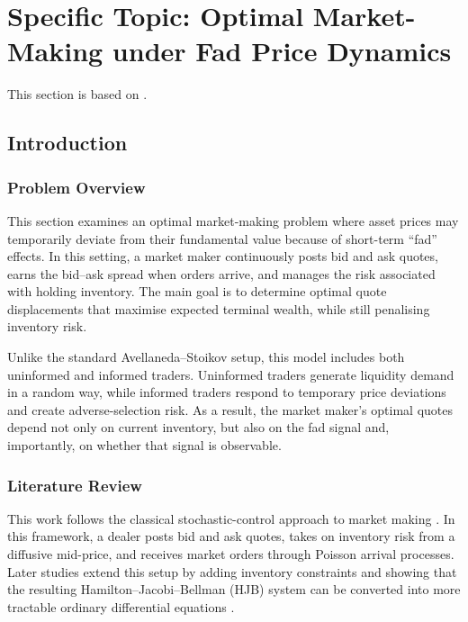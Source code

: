 \documentclass[11pt,a4paper]{article}
\theoremstyle{plain}
\theoremstyle{definition}
\begin{document}
\section{Specific Topic: Optimal Market-Making under Fad Price Dynamics}
\label{sec:specific}

This section is based on \cite{barucci2025market}.

\subsection{Introduction}
\label{subsec:intro}

\subsubsection{Problem Overview}

This section examines an optimal market-making problem where asset prices
may temporarily deviate from their fundamental value because of short-term
``fad'' effects. In this setting, a market maker continuously posts bid and
ask quotes, earns the bid--ask spread when orders arrive, and manages the
risk associated with holding inventory. The main goal is to determine
optimal quote displacements that maximise expected terminal wealth, while
still penalising inventory risk.

Unlike the standard Avellaneda--Stoikov setup, this model includes both
uninformed and informed traders. Uninformed traders generate
liquidity demand in a random way, while informed traders respond to
temporary price deviations and create adverse-selection risk. As a result,
the market maker's optimal quotes depend not only on current inventory, but
also on the fad signal and, importantly, on whether that signal is
observable.

\subsubsection{Literature Review}

This work follows the classical stochastic-control approach to market
making \cite{avellaneda2008high}. In this framework, a dealer posts bid and
ask quotes, takes on inventory risk from a diffusive mid-price, and receives
market orders through Poisson arrival processes. Later studies extend this
setup by adding inventory constraints and showing that the resulting
Hamilton--Jacobi--Bellman (HJB) system can be converted into more tractable
ordinary differential equations \cite{gueant2013dealing}.
\end{document}
